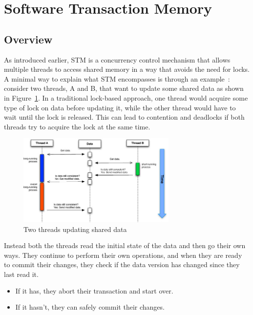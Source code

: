 \section{Software Transaction Memory\label{sec:stm}}

\subsection {Overview}
As introduced earlier, STM is a concurrency control mechanism that allows multiple threads to access shared memory in a way that avoids the need for locks.\\

A minimal way to explain what STM encompasses is through an example~: consider two threads, A and B, that want to update some shared data as shown in Figure~\ref{fig:STM.jpg}. In a traditional lock-based approach, one thread would acquire some type of lock on data before updating it, while the other thread would have to wait until the lock is released. This can lead to contention and deadlocks if both threads try to acquire the lock at the same time\cite{shavit1995software}\cite{kestlerBMC}.

\begin{figure}[H]
    \centering
    \includegraphics[width=0.7\textwidth]{STM.jpg}
    \caption{Two threads updating shared data \cite{kestlerBMC}}
    \label{fig:STM.jpg}
\end{figure}

Instead both the threads read the initial state of the data and then go their own ways. They continue to perform their own operations, and when they are ready to commit their changes, they check if the data version has changed since they last read it. 
\begin{itemize}
    \item If it has, they abort their transaction and start over. 
    \item If it hasn't, they can safely commit their changes. 
\end{itemize}

